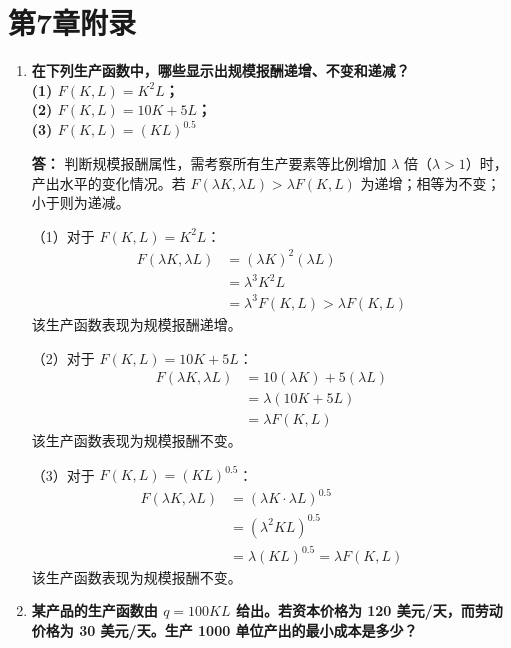 	\section{第7章附录}
	\begin{enumerate}[label=\textbf{\arabic*.}, leftmargin=*]
		\item \textbf{在下列生产函数中，哪些显示出规模报酬递增、不变和递减？\\(1) $F(K, L) = K^2 L$；\\(2) $F(K, L) = 10K + 5L$；\\(3) $F(K, L) = (KL)^{0.5}$}
		
		\textbf{答：}
		判断规模报酬属性，需考察所有生产要素等比例增加 $\lambda$ 倍（$\lambda > 1$）时，产出水平的变化情况。若 $F(\lambda K, \lambda L) > \lambda F(K, L)$ 为递增；相等为不变；小于则为递减。
		
		（1）对于 $F(K, L) = K^2 L$：
		\[
		\begin{aligned}
			F(\lambda K, \lambda L) &= (\lambda K)^2 (\lambda L) \\
			&= \lambda^3 K^2 L \\
			&= \lambda^3 F(K, L) > \lambda F(K, L)
		\end{aligned}
		\]
		该生产函数表现为规模报酬递增。
		
		（2）对于 $F(K, L) = 10K + 5L$：
		\[
		\begin{aligned}
			F(\lambda K, \lambda L) &= 10(\lambda K) + 5(\lambda L) \\
			&= \lambda (10K + 5L) \\
			&= \lambda F(K, L)
		\end{aligned}
		\]
		该生产函数表现为规模报酬不变。
		
		（3）对于 $F(K, L) = (KL)^{0.5}$：
		\[
		\begin{aligned}
			F(\lambda K, \lambda L) &= (\lambda K \cdot \lambda L)^{0.5} \\
			&= (\lambda^2 KL)^{0.5} \\
			&= \lambda (KL)^{0.5} = \lambda F(K, L)
		\end{aligned}
		\]
		该生产函数表现为规模报酬不变。
		
		\item \textbf{某产品的生产函数由 $q = 100KL$ 给出。若资本价格为 120 美元/天，而劳动价格为 30 美元/天。生产 1000 单位产出的最小成本是多少？}
		

\end{enumerate}
